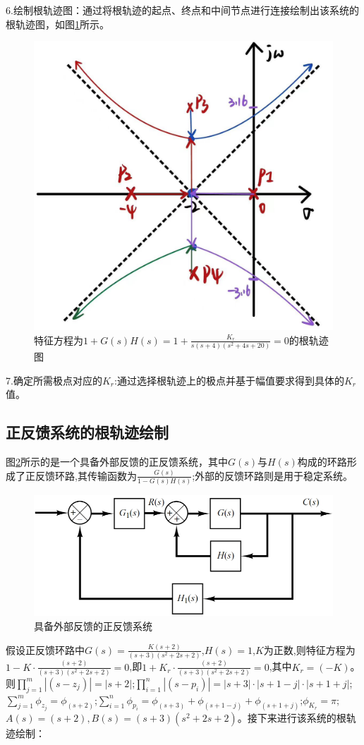 \documentclass{article}
\numberwithin{equation}{section}
\numberwithin{figure}{section}
\begin{document}
6.绘制根轨迹图：通过将根轨迹的起点、终点和中间节点进行连接绘制出该系统的根轨迹图，如图\ref{RootlocusExample}所示。

\begin{figure}
    \centering
    \includegraphics[width=.3\textwidth]{Chapter6/RootlocusExample.jpg} %
    \caption{特征方程为$1+G(s)H(s)=1+\frac{K_r}{s(s+4)(s^2+4s+20)}=0$的根轨迹图} %
    \label{RootlocusExample} %
\end{figure}

7.确定所需极点对应的$K_r$:通过选择根轨迹上的极点并基于幅值要求得到具体的$K_r$值。

\subsection{正反馈系统的根轨迹绘制}

图\ref{PositiveFeedbackSystem}所示的是一个具备外部反馈的正反馈系统，其中$G(s)$与$H(s)$构成的环路形成了正反馈环路,其传输函数为$\frac{G(s)}{1-G(s)H(s)}$;外部的反馈环路则是用于稳定系统。

\begin{figure}
    \centering
    \includegraphics[width=.6\textwidth]{Chapter6/PositiveFeedbackSystem.png} %
    \caption{具备外部反馈的正反馈系统} %
    \label{PositiveFeedbackSystem} %
\end{figure}

假设正反馈环路中$G(s)=\frac{K(s+2)}{(s+3)(s^2+2s+2)}$,$H(s)=1$,$K$为正数,则特征方程为$1-K·\frac{(s+2)}{(s+3)(s^2+2s+2)}=0$,即$1+K_r·\frac{(s+2)}{(s+3)(s^2+2s+2)}=0$,其中$K_r=(-K)$。则$\prod_{j=1}^{m}|(s-z_j)|=|s+2|$;\quad$\prod_{i=1}^{n}|(s-p_i)|=|s+3|·|s+1-j|·|s+1+j|$;\quad$\sum_{j=1}^{m}\phi_{z_j}=\phi_{(s+2)}$;\quad$\sum_{i=1}^{n}\phi_{p_i}=\phi_{(s+3)}+\phi_{(s+1-j)}+\phi_{(s+1+j)}$;\quad$\phi_{K_r}=\pi$;$A(s)=(s+2),B(s)=(s+3)(s^2+2s+2)$。接下来进行该系统的根轨迹绘制：
\end{document}
